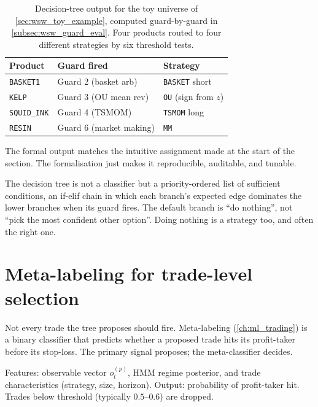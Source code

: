 \begin{table}[htbp]
\centering
\begin{tabular}{lll}
\toprule
Product & Guard fired & Strategy \\
\midrule
\texttt{BASKET1} & Guard 2 (basket arb) & \texttt{BASKET} short \\
\texttt{KELP}    & Guard 3 (OU mean rev) & \texttt{OU} (sign from $z$) \\
\texttt{SQUID\_INK} & Guard 4 (TSMOM)    & \texttt{TSMOM} long \\
\texttt{RESIN}   & Guard 6 (market making) & \texttt{MM} \\
\bottomrule
\end{tabular}
\caption{Decision-tree output for the toy universe of
\cref{sec:wsw_toy_example}, computed guard-by-guard in
\cref{subsec:wsw_guard_eval}. Four products routed to four
different strategies by six threshold tests.}
\label{tab:wsw_toy_selection}
\end{table}

The formal output matches the intuitive assignment made at the
start of the section. The formalisation just makes it reproducible,
auditable, and tunable.

\begin{intuitionbox}
The decision tree is not a classifier but a priority-ordered
list of sufficient conditions, an if-elif chain in which each
branch's expected edge dominates the lower branches when its guard
fires. The default branch is ``do nothing'', not ``pick the most
confident other option''. Doing nothing is a strategy too, and
often the right one.
\end{intuitionbox}

\section{Meta-labeling for trade-level selection}
\label{sec:wsw_metalabel}

Not every trade the tree proposes should fire. Meta-labeling
(\cref{ch:ml_trading}) is a binary classifier that predicts whether
a proposed trade hits its profit-taker before its stop-loss. The
primary signal proposes; the meta-classifier decides.

Features: observable vector $o_t^{(p)}$, HMM regime posterior, and
trade characteristics (strategy, size, horizon). Output: probability
of profit-taker hit. Trades below threshold (typically $0.5$--$0.6$)
are dropped.

